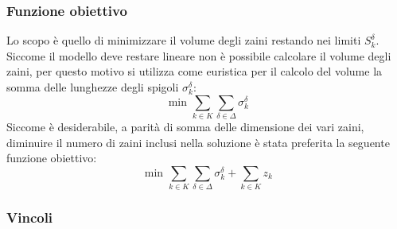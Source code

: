 \documentclass{scrartcl}
\begin{document}
\subsubsection{Funzione obiettivo}
Lo scopo è quello di minimizzare il volume degli zaini restando nei limiti $S_k^\delta$. Siccome il modello deve restare lineare non è possibile calcolare il volume degli zaini, per questo motivo si utilizza come euristica per il calcolo del volume la somma delle lunghezze degli spigoli $\sigma_k^\delta$:
\begin{equation}
\text{ min } \sum_{k \in K} \sum_{\delta \in \Delta} \sigma_k^\delta
\end{equation}
Siccome è desiderabile, a parità di somma delle dimensione dei vari zaini, diminuire il numero di zaini inclusi nella soluzione è stata preferita la seguente funzione obiettivo:
\begin{equation}
\text{ min } \sum_{k \in K} \sum_{\delta \in \Delta} \sigma_k^\delta + \sum_{k \in K} z_k
\end{equation}
\subsubsection{Vincoli}
\end{document}
